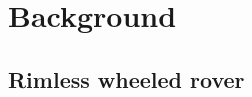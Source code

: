 \documentclass[report.tex]{subfiles}
\begin{document}
    \chapter{Background} \label{chap:background}
    
        

          
    \section{Rimless wheeled rover}
\end{document}
